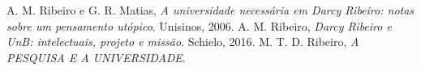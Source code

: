 \documentclass{sbrt}
\begin{document}
\begin{thebibliography}{99}
 A. M. Ribeiro e G. R. Matias, \textit{A universidade necessária em Darcy Ribeiro: notas sobre  um pensamento utópico}. Unisinos, 2006.
 A. M. Ribeiro, \textit{Darcy Ribeiro e UnB: intelectuais, projeto e missão}. Schielo, 2016.
 M. T. D. Ribeiro, \textit{A PESQUISA E A UNIVERSIDADE}.
\end{thebibliography}
\end{document}
